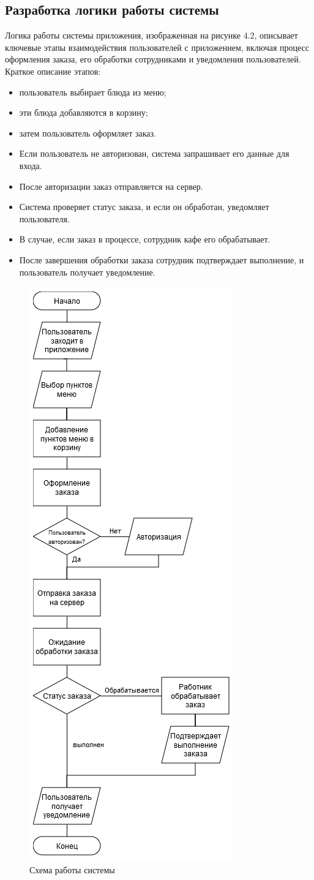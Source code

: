 {    \subsection{Разработка логики работы системы} 
    {
        Логика работы системы приложения, изображенная на рисунке 4.2, описывает ключевые этапы взаимодействия пользователей с приложением, включая процесс оформления заказа, его обработки сотрудниками и уведомления пользователей. Краткое описание этапов:
        \begin{itemize}
            \item пользователь выбирает блюда из меню;
            \item эти блюда добавляются в корзину;
            \item затем пользователь оформляет заказ.
            \item Если пользователь не авторизован, система запрашивает его данные для входа.
            \item После авторизации заказ отправляется на сервер.
            \item Система проверяет статус заказа, и если он обработан, уведомляет пользователя.
            \item В случае, если заказ в процессе, сотрудник кафе его обрабатывает.
            \item После завершения обработки заказа сотрудник подтверждает выполнение, и пользователь получает уведомление.
        \end{itemize}

        \begin{figure}[H]
            \centering
            \includegraphics[height=1.2\textwidth]{assets/scheme.png} 
            \caption{Схема работы системы}
        \end{figure}
    }

}
